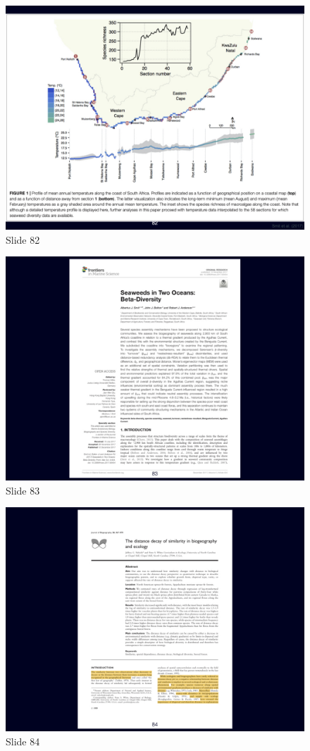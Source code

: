 \documentclass[
  11pt,
]{book}
\begin{document}
\begin{figure}[ht]
\centering
\includegraphics[width=0.8\linewidth]{../images/BDC334/BDC334-082.jpeg}
\caption*{Slide 82}
\end{figure}

\begin{figure}[ht]
\centering
\includegraphics[width=0.8\linewidth]{../images/BDC334/BDC334-083.jpeg}
\caption*{Slide 83}
\end{figure}

\begin{figure}[ht]
\centering
\includegraphics[width=0.8\linewidth]{../images/BDC334/BDC334-084.jpeg}
\caption*{Slide 84}
\end{figure}
\end{document}
